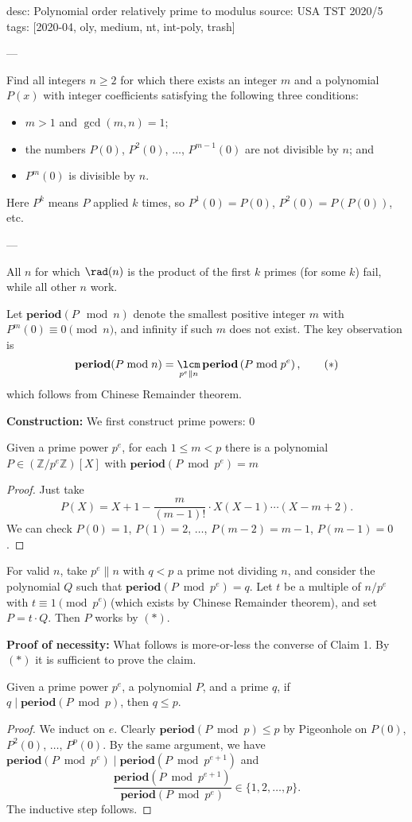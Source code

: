 desc: Polynomial order relatively prime to modulus
source: USA TST 2020/5
tags: [2020-04, oly, medium, nt, int-poly, trash]

---

Find all integers $n\ge2$ for which there exists an integer $m$ and a polynomial $P(x)$ with integer coefficients satisfying the following three conditions:
\begin{itemize}[itemsep=0em]
    \item $m>1$ and $\gcd(m,n)=1$;
    \item the numbers $P(0)$, $P^2(0)$, $\ldots$, $P^{m-1}(0)$ are not divisible by $n$; and
    \item $P^m(0)$ is divisible by $n$.
\end{itemize}
Here $P^k$ means $P$ applied $k$ times, so $P^1(0)=P(0)$, $P^2(0)=P(P(0))$, etc.

---

All $n$ for which $\rad(n)$ is the product of the first $k$ primes (for some $k$) fail, while all other $n$ work.

Let $\mathbf{period}(P\mod n)$ denote the smallest positive integer $m$ with $P^m(0)\equiv0\pmod n$, and infinity if such $m$ does not exist. The key observation is \[\mathbf{period}(P\bmod n)=\mathop{\lcm}_{p^e\parallel n}\mathbf{period}\left(P\bmod p^e\right),\tag{$*$}\]
which follows from Chinese Remainder theorem.

\bigskip

\textbf{Construction:} We first construct prime powers:
\setcounter{claim}0
\begin{claim}
    Given a prime power $p^e$, for each $1\le m<p$ there is a polynomial $P\in(\mathbb Z/p^e\mathbb Z)[X]$ with $\mathbf{period}(P\bmod p^e)=m$
\end{claim}
\begin{proof}
    Just take \[P(X)=X+1-\frac m{(m-1)!}\cdot X(X-1)\cdots(X-m+2).\]
    We can check $P(0)=1$, $P(1)=2$, $\ldots$, $P(m-2)=m-1$, $P(m-1)=0$.
\end{proof}

For valid $n$, take $p^e\parallel n$ with $q<p$ a prime not dividing $n$, and consider the polynomial $Q$ such that $\mathbf{period}(P\bmod p^e)=q$. Let $t$ be a multiple of $n/p^e$ with $t\equiv1\pmod{p^e}$ (which exists by Chinese Remainder theorem), and set $P=t\cdot Q$. Then $P$ works by $(*)$.

\bigskip

\textbf{Proof of necessity:} What follows is more-or-less the converse of Claim 1. By $(*)$ it is sufficient to prove the claim.
\begin{claim}
    Given a prime power $p^e$, a polynomial $P$, and a prime $q$, if $q\mid\mathbf{period}(P\bmod p)$, then $q\le p$.
\end{claim}
\begin{proof}
    We induct on $e$. Clearly $\mathbf{period}(P\bmod p)\le p$ by Pigeonhole on $P(0)$, $P^2(0)$, $\ldots$, $P^p(0)$. By the same argument, we have $\mathbf{period}(P\bmod p^e)\mid \mathbf{period}(P\bmod p^{e+1})$ and \[\frac{\mathbf{period}(P\bmod p^{e+1})}{\mathbf{period}(P\bmod p^e)}\in\{1,2,\ldots,p\}.\]
    The inductive step follows.
\end{proof}

